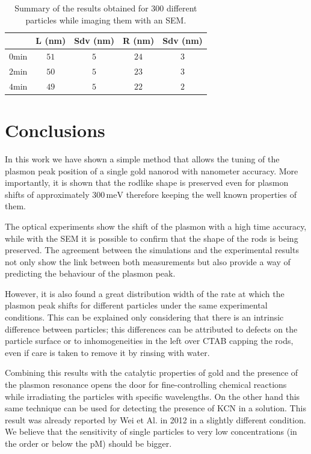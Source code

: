 \documentclass[twocolumn]{article}
\begin{document}
\begin{table}[htbp]
\begin{tabular*}{0.48\textwidth}{c c c c c}
 $\,$ & L (nm) & Sdv (nm) & R (nm) & Sdv (nm) \\\hline
 $0\textrm{min}$ & $51$ & $5$ & $24$ & $3$ \\ 
 $2\textrm{min}$ & $50$ & $5$ & $23$ & $3$ \\
 $4\textrm{min}$ & $49$ & $5$ & $22$ & $2$ \\
\end{tabular*}
\label{tab:SEM_results}
\caption{Summary of the results obtained for 300 different particles while
imaging them with an SEM.}
\end{table}


\section{Conclusions}
In this work we have shown a simple method that allows the tuning of the plasmon
peak position of a single gold nanorod with nanometer accuracy. More
importantly, it is shown that the rodlike shape is preserved even for plasmon
shifts of approximately $300\,\textrm{meV}$ therefore keeping the well known
properties of them.

The optical experiments show the shift of the plasmon with a high time
accuracy, while with the SEM it is possible to confirm that the shape of the
rods is being preserved. The agreement between the simulations and the
experimental results not only show the link between both measurements but also
provide a way of predicting the behaviour of the plasmon peak. 

However, it is also found a great distribution width of the rate at which the
plasmon peak shifts for different particles under the same experimental
conditions. This can be explained only considering that there is an intrinsic
difference between particles; this differences can be attributed to defects on
the particle surface or to inhomogeneities in the left over CTAB capping the
rods, even if care is taken to remove it by rinsing with water.

Combining this results with the catalytic properties of gold and the presence of
the plasmon resonance opens the door for fine-controlling chemical reactions
while irradiating the particles with specific wavelengths. On the other hand
this same technique can be used for detecting the presence of KCN in a
solution. This result was already reported by Wei et Al. in 2012 \cite{Wei2012}
in a slightly different condition. We believe that the sensitivity of single
particles to very low concentrations (in the order or below the pM) should be
bigger.

{}

\end{document}
